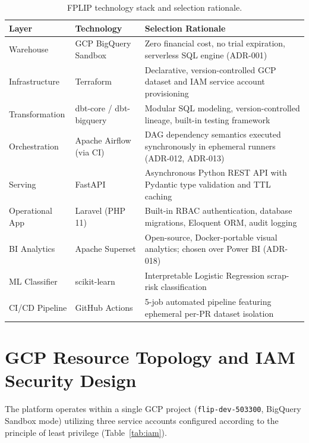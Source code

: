 \documentclass[12pt, a4paper]{report}
\begin{document}
\begin{table}[h]
\centering
\begin{tabularx}{\textwidth}{@{}p{2.6cm} p{3.0cm} X@{}}
\toprule
\textbf{\color{primary}Layer} & \textbf{\color{primary}Technology} & \textbf{\color{primary}Selection Rationale} \\
\midrule
Warehouse & GCP BigQuery Sandbox & Zero financial cost, no trial expiration, serverless SQL engine (ADR-001) \\
Infrastructure & Terraform & Declarative, version-controlled GCP dataset and IAM service account provisioning \\
Transformation & dbt-core / dbt-bigquery & Modular SQL modeling, version-controlled lineage, built-in testing framework \\
Orchestration & Apache Airflow (via CI) & DAG dependency semantics executed synchronously in ephemeral runners (ADR-012, ADR-013) \\
Serving & FastAPI & Asynchronous Python REST API with Pydantic type validation and TTL caching \\
Operational App & Laravel (PHP 11) & Built-in RBAC authentication, database migrations, Eloquent ORM, audit logging \\
BI Analytics & Apache Superset & Open-source, Docker-portable visual analytics; chosen over Power BI (ADR-018) \\
ML Classifier & scikit-learn & Interpretable Logistic Regression scrap-risk classification \\
CI/CD Pipeline & GitHub Actions & 5-job automated pipeline featuring ephemeral per-PR dataset isolation \\
\bottomrule
\end{tabularx}
\caption{FPLIP technology stack and selection rationale.}
\label{tab:tech-stack}
\end{table}

\section{GCP Resource Topology and IAM Security Design}
The platform operates within a single GCP project (\texttt{flip-dev-503300}, BigQuery Sandbox mode) utilizing three service accounts configured according to the principle of least privilege (Table~\ref{tab:iam}).
\end{document}
